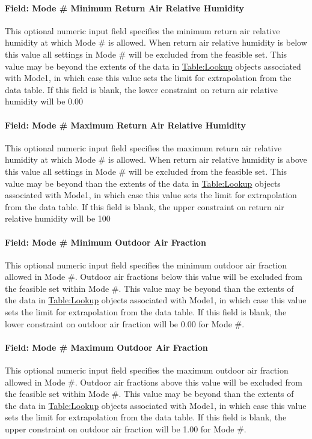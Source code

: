 \paragraph{Field: Mode \# Minimum Return Air Relative Humidity}
This optional numeric input field specifies the minimum return air relative humidity at which Mode \# is allowed. When return air relative humidity is below this value all settings in Mode \# will be excluded from the feasible set. This value may be beyond the extents of the data in \hyperref[tablelookup]{Table:Lookup} objects associated with Mode1, in which case this value sets the limit for extrapolation from the data table. If this field is blank, the lower constraint on return air relative humidity will be 0.00%

\paragraph{Field: Mode \# Maximum Return Air Relative Humidity}
This optional numeric input field specifies the maximum return air relative humidity at which Mode \# is allowed. When return air relative humidity is above this value all settings in Mode \# will be excluded from the feasible set. This value may be beyond than the extents of the data in \hyperref[tablelookup]{Table:Lookup} objects associated with Mode1, in which case this value sets the limit for extrapolation from the data table. If this field is blank, the upper constraint on return air relative humidity will be 100%

\paragraph{Field: Mode \# Minimum Outdoor Air Fraction}
This optional numeric input field specifies the minimum outdoor air fraction allowed in Mode \#. Outdoor air fractions below this value will be excluded from the feasible set within Mode \#. This value may be beyond than the extents of the data in \hyperref[tablelookup]{Table:Lookup} objects associated with Mode1, in which case this value sets the limit for extrapolation from the data table. If this field is blank, the lower constraint on outdoor air fraction will be 0.00 for Mode \#.

\paragraph{Field: Mode \# Maximum Outdoor Air Fraction}
This optional numeric input field specifies the maximum outdoor air fraction allowed in Mode \#. Outdoor air fractions above this value will be excluded from the feasible set within Mode \#. This value may be beyond than the extents of the data in \hyperref[tablelookup]{Table:Lookup} objects associated with Mode1, in which case this value sets the limit for extrapolation from the data table. If this field is blank, the upper constraint on outdoor air fraction will be 1.00 for Mode \#.


